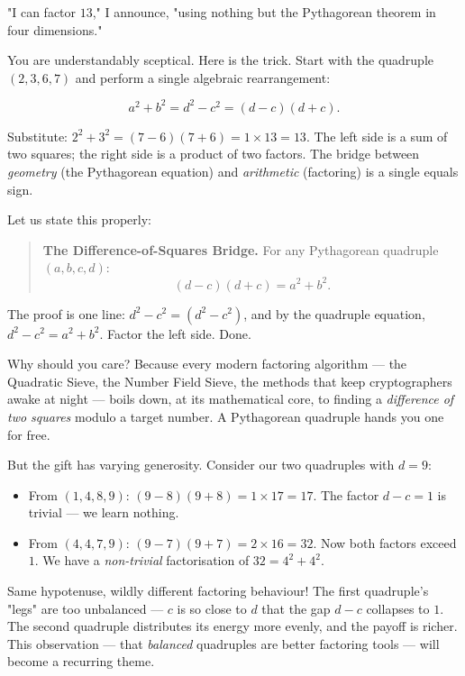"I can factor $13$," I announce, "using nothing but the Pythagorean theorem in four dimensions."

You are understandably sceptical. Here is the trick. Start with the quadruple $(2, 3, 6, 7)$ and perform a single algebraic rearrangement:

\[
a^2 + b^2 = d^2 - c^2 = (d - c)(d + c).
\]

Substitute: $2^2 + 3^2 = (7 - 6)(7 + 6) = 1 \times 13 = 13$. The left side is a sum of two squares; the right side is a product of two factors. The bridge between \textit{geometry} (the Pythagorean equation) and \textit{arithmetic} (factoring) is a single equals sign.

Let us state this properly:

\begin{quote}
\textbf{The Difference-of-Squares Bridge.} For any Pythagorean quadruple $(a, b, c, d)$:
$$(d - c)(d + c) = a^2 + b^2.$$
\end{quote}

The proof is one line: $d^2 - c^2 = (d^2 - c^2)$, and by the quadruple equation, $d^2 - c^2 = a^2 + b^2$. Factor the left side. Done.

Why should you care? Because every modern factoring algorithm --- the Quadratic Sieve, the Number Field Sieve, the methods that keep cryptographers awake at night --- boils down, at its mathematical core, to finding a \textit{difference of two squares} modulo a target number. A Pythagorean quadruple hands you one for free.

But the gift has varying generosity. Consider our two quadruples with $d = 9$:

\begin{itemize}[leftmargin=*]
\item From $(1, 4, 8, 9)$: $(9 - 8)(9 + 8) = 1 \times 17 = 17$. The factor $d - c = 1$ is trivial --- we learn nothing.
\item From $(4, 4, 7, 9)$: $(9 - 7)(9 + 7) = 2 \times 16 = 32$. Now both factors exceed $1$. We have a \textit{non-trivial} factorisation of $32 = 4^2 + 4^2$.
\end{itemize}

Same hypotenuse, wildly different factoring behaviour! The first quadruple's "legs" are too unbalanced --- $c$ is so close to $d$ that the gap $d - c$ collapses to $1$. The second quadruple distributes its energy more evenly, and the payoff is richer. This observation --- that \textit{balanced} quadruples are better factoring tools --- will become a recurring theme.

